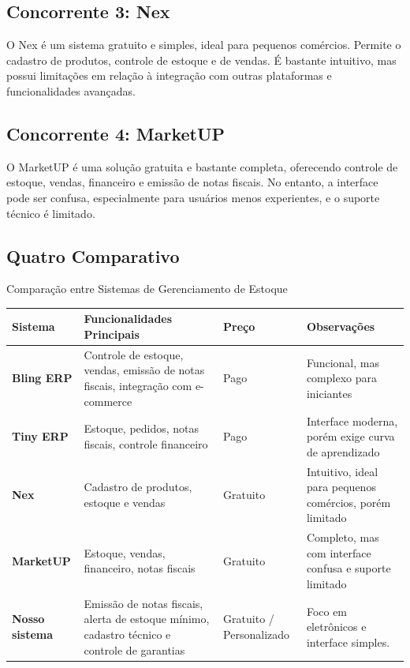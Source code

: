 \documentclass[
	12pt,				%
	openany,			%
	twoside,			%
	a4paper,			%
	english,			%
	brazil				%
	]{abntex2}
\begin{document}
\subsection{Concorrente 3: Nex}
O Nex é um sistema gratuito e simples, ideal para pequenos comércios. Permite o cadastro de produtos, controle de estoque e de vendas. É bastante intuitivo, mas possui limitações em relação à integração com outras plataformas e funcionalidades avançadas.

\subsection{Concorrente 4: MarketUP}
O MarketUP é uma solução gratuita e bastante completa, oferecendo controle de estoque, vendas, financeiro e emissão de notas fiscais. No entanto, a interface pode ser confusa, especialmente para usuários menos experientes, e o suporte técnico é limitado.

\subsection{Quatro Comparativo}

\begin{quadro}[htb]
\caption{\label{quadro_comparativo}Comparação entre Sistemas de Gerenciamento de Estoque}
\begin{tabular}{|p{3.2cm}|p{5.5cm}|p{2.2cm}|p{4.1cm}|}
\hline
\textbf{Sistema} & \textbf{Funcionalidades Principais} & \textbf{Preço} & \textbf{Observações} \\
\hline
\textbf{Bling ERP} & Controle de estoque, vendas, emissão de notas fiscais, integração com e-commerce & Pago & Funcional, mas complexo para iniciantes \\
\hline
\textbf{Tiny ERP} & Estoque, pedidos, notas fiscais, controle financeiro & Pago & Interface moderna, porém exige curva de aprendizado \\
\hline
\textbf{Nex} & Cadastro de produtos, estoque e vendas & Gratuito & Intuitivo, ideal para pequenos comércios, porém limitado \\
\hline
\textbf{MarketUP} & Estoque, vendas, financeiro, notas fiscais & Gratuito & Completo, mas com interface confusa e suporte limitado \\
\hline
\textbf{Nosso sistema} & Emissão de notas fiscais, alerta de estoque mínimo, cadastro técnico e controle de garantias & Gratuito / Personalizado & Foco em eletrônicos e interface simples. \\
\hline
\end{tabular}
\end{quadro}
\end{document}
